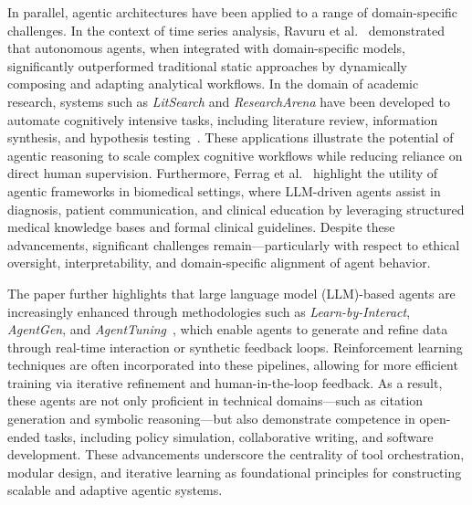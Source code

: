 \vspace{0.5cm}

In parallel, agentic architectures have been applied to a range of domain-specific challenges. In the context of time series analysis, Ravuru et al.~\cite{ravuru2024agent} demonstrated that autonomous agents, when integrated with domain-specific models, significantly outperformed traditional static approaches by dynamically composing and adapting analytical workflows. In the domain of academic research, systems such as \textit{LitSearch} and \textit{ResearchArena} have been developed to automate cognitively intensive tasks, including literature review, information synthesis, and hypothesis testing~\cite{kang2024researcharena}. These applications illustrate the potential of agentic reasoning to scale complex cognitive workflows while reducing reliance on direct human supervision. Furthermore, Ferrag et al.~\cite{ferrag2025can} highlight the utility of agentic frameworks in biomedical settings, where LLM-driven agents assist in diagnosis, patient communication, and clinical education by leveraging structured medical knowledge bases and formal clinical guidelines. Despite these advancements, significant challenges remain—particularly with respect to ethical oversight, interpretability, and domain-specific alignment of agent behavior.

\vspace{0.5cm}

The paper further highlights that large language model (LLM)-based agents are increasingly enhanced through methodologies such as \textit{Learn-by-Interact}, \textit{AgentGen}, and \textit{AgentTuning}~\cite{zeng2024agenttuning}, which enable agents to generate and refine data through real-time interaction or synthetic feedback loops. Reinforcement learning techniques are often incorporated into these pipelines, allowing for more efficient training via iterative refinement and human-in-the-loop feedback. As a result, these agents are not only proficient in technical domains—such as citation generation and symbolic reasoning—but also demonstrate competence in open-ended tasks, including policy simulation, collaborative writing, and software development. These advancements underscore the centrality of tool orchestration, modular design, and iterative learning as foundational principles for constructing scalable and adaptive agentic systems.

\vspace{0.5cm}

